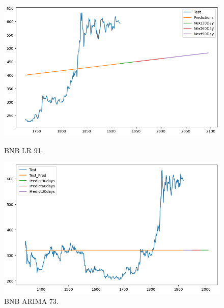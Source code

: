 \documentclass{ieeeojies}
\begin{document}
\begin{figure}[H]
  \centering
  \begin{minipage}{0.48\linewidth}
    \centering
    \includegraphics[width=1\linewidth]{image/BNB_LR_91.png}
    \caption{BNB LR 91.}
  \end{minipage}  
    \hfill
  \begin{minipage}{0.48\linewidth}
    \centering
    \includegraphics[width=1\linewidth]{image/BNB_ARIMA_73.png}
    \caption{BNB ARIMA 73.}
  \end{minipage}  
\end{figure}
\end{document}
